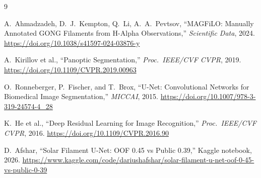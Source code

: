 \documentclass[sigconf,nonacm]{acmart}
\begin{document}
\begin{thebibliography}{9}

A.~Ahmadzadeh, D.~J.~Kempton, Q.~Li, A.~A.~Pevtsov,
``MAGFiLO: Manually Annotated GONG Filaments from H-Alpha
Observations,''
\textit{Scientific Data}, 2024.
\url{https://doi.org/10.1038/s41597-024-03876-y}

A.~Kirillov et al.,
``Panoptic Segmentation,''
\textit{Proc.\ IEEE/CVF CVPR}, 2019.
\url{https://doi.org/10.1109/CVPR.2019.00963}

O.~Ronneberger, P.~Fischer, and T.~Brox,
``U-Net: Convolutional Networks for Biomedical Image Segmentation,''
\textit{MICCAI}, 2015.
\url{https://doi.org/10.1007/978-3-319-24574-4_28}

K.~He et al.,
``Deep Residual Learning for Image Recognition,''
\textit{Proc.\ IEEE/CVF CVPR}, 2016.
\url{https://doi.org/10.1109/CVPR.2016.90}

D.~Afshar,
``Solar Filament U-Net: OOF 0.45 vs Public 0.39,''
Kaggle notebook, 2026.
\url{https://www.kaggle.com/code/dariushafshar/solar-filament-u-net-oof-0-45-vs-public-0-39}

\end{thebibliography}
\end{document}
